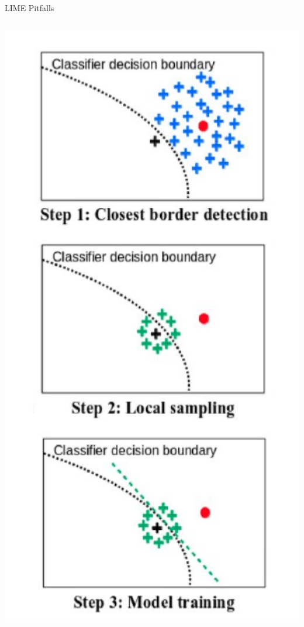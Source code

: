 \documentclass[11pt,compress,t,notes=noshow, xcolor=table]{beamer}
\begin{document}
\begin{vbframe}{LIME Pitfalls}
\begin{columns}
\begin{column}{0.2\textwidth}
			\vspace{-0.2cm}
		\includegraphics[width=1.2\textwidth]{figure/lime_bordersample2}
		
		\vspace{-0.3cm}
		

\end{column}
\end{columns}
\end{vbframe}
\end{document}
